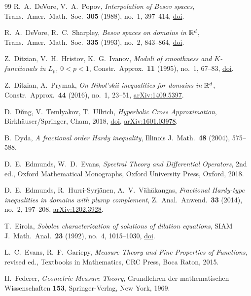 \begin{thebibliography}{99}
R.~A.~DeVore, V.~A.~Popov,
\emph{Interpolation of Besov spaces},
Trans.\ Amer.\ Math.\ Soc.\ \textbf{305} (1988), no.~1, 397--414,
\href{https://doi.org/10.1090/S0002-9947-1988-0920166-3}{doi}.

R.~A.~DeVore, R.~C.~Sharpley,
\emph{Besov spaces on domains in $\mathbb{R}^d$},
Trans.\ Amer.\ Math.\ Soc.\ \textbf{335} (1993), no.~2, 843--864,
\href{https://doi.org/10.1090/S0002-9947-1993-1152321-6}{doi}.

Z.~Ditzian, V.~H.~Hristov, K.~G.~Ivanov,
\emph{Moduli of smoothness and $K$-functionals in $L_p$, $0 < p < 1$},
Constr.\ Approx.\ \textbf{11} (1995), no.~1, 67--83,
\href{https://doi.org/10.1007/BF01294339}{doi}.

Z.~Ditzian, A.~Prymak,
\emph{On Nikol'skii inequalities for domains in $\mathbb{R}^d$},
Constr.\ Approx.\ \textbf{44} (2016), no.~1, 23--51,
\href{https://arxiv.org/abs/1409.5397}{arXiv:1409.5397}.

D.~D\~ung, V.~Temlyakov, T.~Ullrich,
\emph{Hyperbolic Cross Approximation},
Birkh\"auser/Springer, Cham, 2018,
\href{https://doi.org/10.1007/978-3-319-92240-9}{doi},
\href{https://arxiv.org/abs/1601.03978}{arXiv:1601.03978}.

B.~Dyda,
\emph{A fractional order Hardy inequality},
Illinois J.\ Math.\ \textbf{48} (2004), 575--588.

D.~E.~Edmunds, W.~D.~Evans,
\emph{Spectral Theory and Differential Operators}, 2nd ed.,
Oxford Mathematical Monographs, Oxford University Press, Oxford, 2018.

D.~E.~Edmunds, R.~Hurri-Syrj\"anen, A.~V.~V\"ah\"akangas,
\emph{Fractional Hardy-type inequalities in domains with plump complement},
Z.\ Anal.\ Anwend.\ \textbf{33} (2014), no.~2, 197--208,
\href{https://arxiv.org/abs/1202.3928}{arXiv:1202.3928}.

T.~Eirola,
\emph{Sobolev characterization of solutions of dilation equations},
SIAM J.\ Math.\ Anal.\ \textbf{23} (1992), no.~4, 1015--1030,
\href{https://doi.org/10.1137/0523058}{doi}.

L.~C.~Evans, R.~F.~Gariepy,
\emph{Measure Theory and Fine Properties of Functions}, revised ed.,
Textbooks in Mathematics, CRC Press, Boca Raton, 2015.

H.~Federer,
\emph{Geometric Measure Theory},
Grundlehren der mathematischen Wissenschaften \textbf{153}, Springer-Verlag, New York, 1969.


\end{thebibliography}
